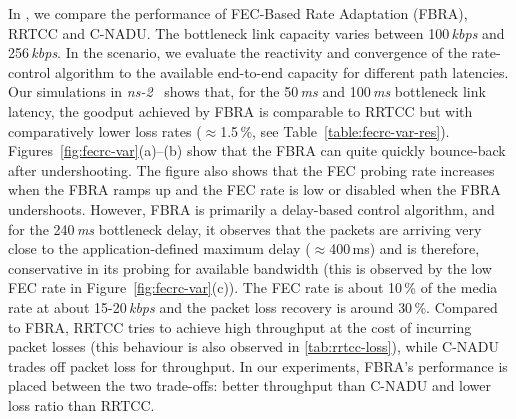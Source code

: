 In , we compare the performance of FEC-Based Rate Adaptation
(FBRA), RRTCC and C-NADU. The bottleneck link capacity varies between
100\,\emph{kbps} and 256\,\emph{kbps}. In the scenario, we evaluate the
reactivity and convergence of the rate-control algorithm to the available 
end-to-end capacity for different path latencies. Our simulations in
\emph{ns-2}~\cite{ns2} shows that, for the 50\,\emph{ms} and 100\,\emph{ms}
bottleneck link latency, the goodput achieved by FBRA is comparable to RRTCC
but with comparatively lower loss rates ($\approx$1.5\,\%, see
Table~\ref{table:fecrc-var-res}). Figures~\ref{fig:fecrc-var}(a)--(b) show
that the FBRA can quite quickly bounce-back after undershooting. The figure
also shows that the FEC probing rate increases when the FBRA ramps up and the
FEC rate is low or disabled when the FBRA undershoots. However, FBRA is
primarily a delay-based control algorithm, and for the 240\,\emph{ms} bottleneck
delay, it observes that the packets are arriving very close to the 
application-defined maximum delay ($\approx$400\,ms) and is therefore, conservative in its
probing for available bandwidth (this is observed by the low FEC rate in
Figure~\ref{fig:fecrc-var}(c)). The FEC rate is about 10\,\% of the media rate at
about 15-20\,\emph{kbps} and the packet loss recovery is around 30\,\%.
Compared to FBRA, RRTCC tries to achieve high throughput at the cost of
incurring packet losses (this behaviour is also observed in \ref{tab:rrtcc-loss}), 
while C-NADU trades off packet loss for throughput. In our
experiments, FBRA's performance is placed between the two trade-offs: better
throughput than C-NADU and lower loss ratio than RRTCC.


